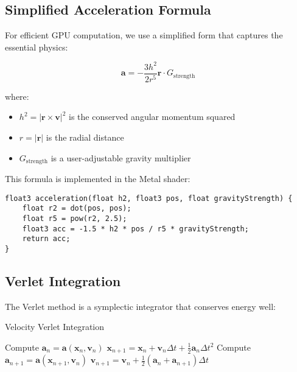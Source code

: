 \documentclass[12pt,a4paper]{article}
\theoremstyle{definition}
\theoremstyle{remark}
\begin{document}
\subsection{Simplified Acceleration Formula}

For efficient GPU computation, we use a simplified form that captures the essential physics:

\begin{equation}
    \mathbf{a} = -\frac{3h^2}{2r^5}\mathbf{r} \cdot G_{\text{strength}}
\end{equation}

where:
\begin{itemize}
    \item $h^2 = |\mathbf{r} \times \mathbf{v}|^2$ is the conserved angular momentum squared
    \item $r = |\mathbf{r}|$ is the radial distance
    \item $G_{\text{strength}}$ is a user-adjustable gravity multiplier
\end{itemize}

This formula is implemented in the Metal shader:

\begin{lstlisting}[style=metalstyle, caption=Acceleration calculation in Metal]
float3 acceleration(float h2, float3 pos, float gravityStrength) {
    float r2 = dot(pos, pos);
    float r5 = pow(r2, 2.5);
    float3 acc = -1.5 * h2 * pos / r5 * gravityStrength;
    return acc;
}
\end{lstlisting}

\subsection{Verlet Integration}

The Verlet method is a symplectic integrator that conserves energy well:

\begin{algorithm}
\caption{Velocity Verlet Integration}
\begin{algorithmic}
\STATE Compute $\mathbf{a}_n = \mathbf{a}(\mathbf{x}_n, \mathbf{v}_n)$
\STATE $\mathbf{x}_{n+1} = \mathbf{x}_n + \mathbf{v}_n \Delta t + \frac{1}{2}\mathbf{a}_n \Delta t^2$
\STATE Compute $\mathbf{a}_{n+1} = \mathbf{a}(\mathbf{x}_{n+1}, \mathbf{v}_n)$
\STATE $\mathbf{v}_{n+1} = \mathbf{v}_n + \frac{1}{2}(\mathbf{a}_n + \mathbf{a}_{n+1})\Delta t$
\end{algorithmic}
\end{algorithm}
\end{document}
